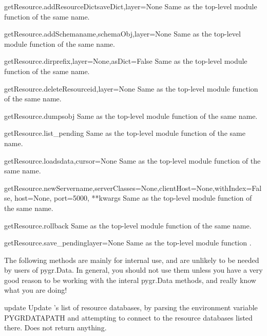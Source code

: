 \documentclass{howto}
\begin{document}
\begin{funcdesc}{getResource.addResourceDict}{saveDict,layer=None}
  Same as the top-level module function of the same name.
\end{funcdesc}

\begin{funcdesc}{getResource.addSchema}{name,schemaObj,layer=None}
  Same as the top-level module function of the same name.
\end{funcdesc}

\begin{funcdesc}{getResource.dir}{prefix,layer=None,asDict=False}
  Same as the top-level module function of the same name.
\end{funcdesc}

\begin{funcdesc}{getResource.deleteResource}{id,layer=None}
  Same as the top-level module function of the same name.
\end{funcdesc}

\begin{funcdesc}{getResource.dumps}{obj}
  Same as the top-level module function of the same name.
\end{funcdesc}

\begin{funcdesc}{getResource.list_pending}{}
  Same as the top-level module function of the same name.
\end{funcdesc}

\begin{funcdesc}{getResource.loads}{data,cursor=None}
  Same as the top-level module function of the same name.
\end{funcdesc}

\begin{funcdesc}{getResource.newServer}{name,serverClasses=None,clientHost=None,withIndex=False, host=None, port=5000, **kwargs}
  Same as the top-level module function of the same name.
\end{funcdesc}

\begin{funcdesc}{getResource.rollback}{}
  Same as the top-level module function of the same name.
\end{funcdesc}

\begin{funcdesc}{getResource.save_pending}{layer=None}
  Same as the top-level module function .
\end{funcdesc}

The following methods are mainly for internal use, and are unlikely to be
needed by users of pygr.Data.  In general, you should not use them unless
you have a very good reason to be working with the interal pygr.Data 
methods, and really know what you are doing!
\begin{funcdesc}{update}{}
  Update 's list of resource databases, by parsing the environment
  variable PYGRDATAPATH and attempting to connect to the resource databases
  listed there.  Does not return anything.
\end{funcdesc}
\end{document}
